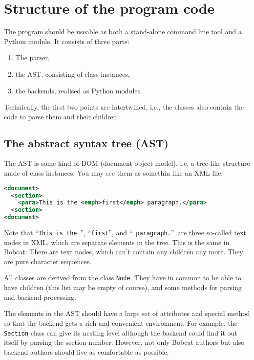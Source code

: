 \documentclass[12pt,openany]{book}
\begin{document}
\section{Structure of the program code}

The program should be useable as both a stand-alone command line tool and a
Python module.  It consists of three parts:

\begin{enumerate}
\item The parser,
\item the AST, consisting of class instances,
\item the backends, realised as Python modules.
\end{enumerate}

Technically, the first two points are intertwined, i.e., the classes also
contain the code to parse them and their children.

\subsection{The abstract syntax tree (AST)}

The AST is some kind of DOM (document object model), i.e. a tree-like structure
made of class instances.  You may see them as somethin like an XML file:

\begin{lstlisting}[language=XML]
<document>
  <section>
    <para>This is the <emph>first</emph> paragraph.</para>
  <section>
<document>
\end{lstlisting}

Note that ``\texttt{This is the~}'', ``\texttt{first}'', and
``~\texttt{paragraph.}''\ are three so-called text nodes in XML, which are
separate elements in the tree.  This is the same in Bobcat: There are text
nodes, which can't contain any children any more.  They are pure character
sequences.

All classes are derived from the class \lstinline{Node}.  They have in common
to be able to have children (this list may be empty of course), and some
methods for parsing and backend-processing.

\bigskip
%
The elements in the AST should have a large set of attributes and special
method so that the backend gets a rich and convenient environment.  For
example, the \lstinline{Section} class can give its nesting level although the
backend could find it out itself by parsing the section number.  However, not
only Bobcat authors but also backend authors should live as comfortable as
possible.
\end{document}
